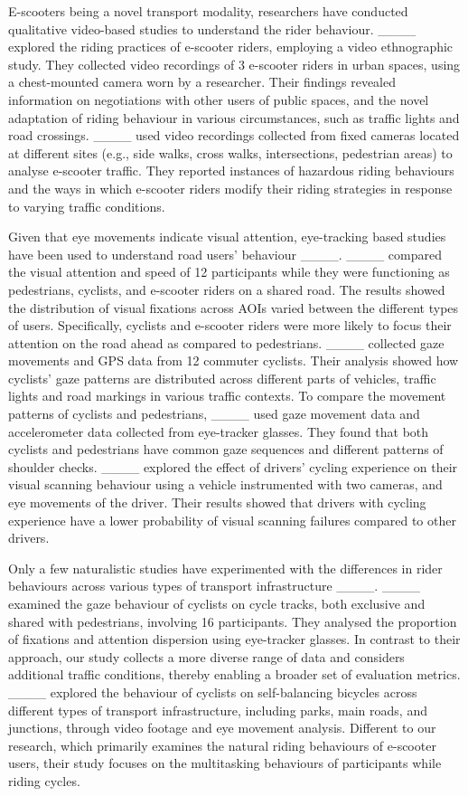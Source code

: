 E-scooters being a novel transport modality, researchers have conducted qualitative video-based studies to understand the rider behaviour. ____ explored the riding practices of e-scooter riders, employing a video ethnographic study. They collected video recordings of 3 e-scooter riders in urban spaces, using a chest-mounted camera worn by a researcher. Their findings revealed information on negotiations with other users of public spaces, and the novel adaptation of riding behaviour in various circumstances, such as traffic lights and road crossings. ____ used video recordings collected from fixed cameras located at different sites (e.g., side walks, cross walks, intersections, pedestrian areas) to analyse e-scooter traffic. They reported instances of hazardous riding behaviours and the ways in which e-scooter riders modify their riding strategies in response to varying traffic conditions.

Given that eye movements indicate visual attention, eye-tracking based studies have been used to understand road users' behaviour ____. ____ compared the visual attention and speed of 12 participants while they were functioning as pedestrians, cyclists, and e-scooter riders on a shared road. The results showed the distribution of visual fixations across AOIs varied between the different types of users. Specifically, cyclists and e-scooter riders were more likely to focus their attention on the road ahead as compared to pedestrians. ____ collected gaze movements and GPS data from 12 commuter cyclists. Their analysis showed how cyclists' gaze patterns are distributed across different parts of vehicles, traffic lights and road markings in various traffic contexts. To compare the movement patterns of cyclists and pedestrians, ____ used gaze movement data and accelerometer data collected from eye-tracker glasses. They found that both cyclists and pedestrians have common gaze sequences and different patterns of shoulder checks. ____ explored the effect of drivers’ cycling experience on their visual scanning behaviour using a vehicle instrumented with two cameras, and eye movements of the driver. Their results showed that drivers with cycling experience have a lower probability of visual scanning failures compared to other drivers.

Only a few naturalistic studies have experimented with the differences in rider behaviours across various types of transport infrastructure ____. ____ examined the gaze behaviour of cyclists on cycle tracks, both exclusive and shared with pedestrians, involving 16 participants. They analysed the proportion of fixations and attention dispersion using eye-tracker glasses. In contrast to their approach, our study collects a more diverse range of data and considers additional traffic conditions, thereby enabling a broader set of evaluation metrics. ____ explored the behaviour of cyclists on self-balancing bicycles across different types of transport infrastructure, including parks, main roads, and junctions, through video footage and eye movement analysis. Different to our research, which primarily examines the natural riding behaviours of e-scooter users, their study focuses on the multitasking behaviours of participants while riding cycles.

